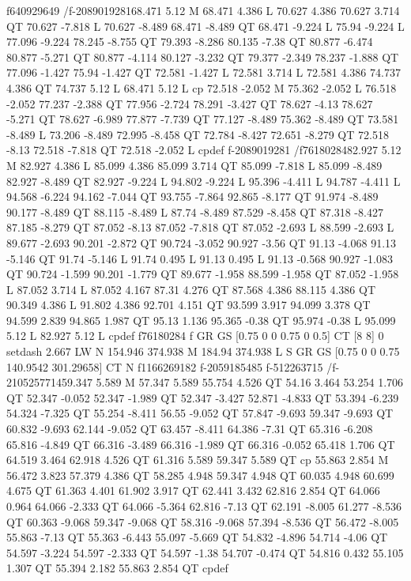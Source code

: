f640929649
/f-2089019281{68.471 5.12 M
68.471 4.386 L
70.627 4.386 70.627 3.714 QT
70.627 -7.818 L
70.627 -8.489 68.471 -8.489 QT
68.471 -9.224 L
75.94 -9.224 L
77.096 -9.224 78.245 -8.755 QT
79.393 -8.286 80.135 -7.38 QT
80.877 -6.474 80.877 -5.271 QT
80.877 -4.114 80.127 -3.232 QT
79.377 -2.349 78.237 -1.888 QT
77.096 -1.427 75.94 -1.427 QT
72.581 -1.427 L
72.581 3.714 L
72.581 4.386 74.737 4.386 QT
74.737 5.12 L
68.471 5.12 L
cp
72.518 -2.052 M
75.362 -2.052 L
76.518 -2.052 77.237 -2.388 QT
77.956 -2.724 78.291 -3.427 QT
78.627 -4.13 78.627 -5.271 QT
78.627 -6.989 77.877 -7.739 QT
77.127 -8.489 75.362 -8.489 QT
73.581 -8.489 L
73.206 -8.489 72.995 -8.458 QT
72.784 -8.427 72.651 -8.279 QT
72.518 -8.13 72.518 -7.818 QT
72.518 -2.052 L
cp}def
f-2089019281
/f76180284{82.927 5.12 M
82.927 4.386 L
85.099 4.386 85.099 3.714 QT
85.099 -7.818 L
85.099 -8.489 82.927 -8.489 QT
82.927 -9.224 L
94.802 -9.224 L
95.396 -4.411 L
94.787 -4.411 L
94.568 -6.224 94.162 -7.044 QT
93.755 -7.864 92.865 -8.177 QT
91.974 -8.489 90.177 -8.489 QT
88.115 -8.489 L
87.74 -8.489 87.529 -8.458 QT
87.318 -8.427 87.185 -8.279 QT
87.052 -8.13 87.052 -7.818 QT
87.052 -2.693 L
88.599 -2.693 L
89.677 -2.693 90.201 -2.872 QT
90.724 -3.052 90.927 -3.56 QT
91.13 -4.068 91.13 -5.146 QT
91.74 -5.146 L
91.74 0.495 L
91.13 0.495 L
91.13 -0.568 90.927 -1.083 QT
90.724 -1.599 90.201 -1.779 QT
89.677 -1.958 88.599 -1.958 QT
87.052 -1.958 L
87.052 3.714 L
87.052 4.167 87.31 4.276 QT
87.568 4.386 88.115 4.386 QT
90.349 4.386 L
91.802 4.386 92.701 4.151 QT
93.599 3.917 94.099 3.378 QT
94.599 2.839 94.865 1.987 QT
95.13 1.136 95.365 -0.38 QT
95.974 -0.38 L
95.099 5.12 L
82.927 5.12 L
cp}def
f76180284
f
GR
GS
[0.75 0 0 0.75 0 0.5] CT
[8 8] 0 setdash
2.667 LW
N
154.946 374.938 M
184.94 374.938 L
S
GR
GS
[0.75 0 0 0.75 140.9542 301.29658] CT
N
f1166269182
f-2059185485
f-512263715
/f-2105257714{59.347 5.589 M
57.347 5.589 55.754 4.526 QT
54.16 3.464 53.254 1.706 QT
52.347 -0.052 52.347 -1.989 QT
52.347 -3.427 52.871 -4.833 QT
53.394 -6.239 54.324 -7.325 QT
55.254 -8.411 56.55 -9.052 QT
57.847 -9.693 59.347 -9.693 QT
60.832 -9.693 62.144 -9.052 QT
63.457 -8.411 64.386 -7.31 QT
65.316 -6.208 65.816 -4.849 QT
66.316 -3.489 66.316 -1.989 QT
66.316 -0.052 65.418 1.706 QT
64.519 3.464 62.918 4.526 QT
61.316 5.589 59.347 5.589 QT
cp
55.863 2.854 M
56.472 3.823 57.379 4.386 QT
58.285 4.948 59.347 4.948 QT
60.035 4.948 60.699 4.675 QT
61.363 4.401 61.902 3.917 QT
62.441 3.432 62.816 2.854 QT
64.066 0.964 64.066 -2.333 QT
64.066 -5.364 62.816 -7.13 QT
62.191 -8.005 61.277 -8.536 QT
60.363 -9.068 59.347 -9.068 QT
58.316 -9.068 57.394 -8.536 QT
56.472 -8.005 55.863 -7.13 QT
55.363 -6.443 55.097 -5.669 QT
54.832 -4.896 54.714 -4.06 QT
54.597 -3.224 54.597 -2.333 QT
54.597 -1.38 54.707 -0.474 QT
54.816 0.432 55.105 1.307 QT
55.394 2.182 55.863 2.854 QT
cp}def
